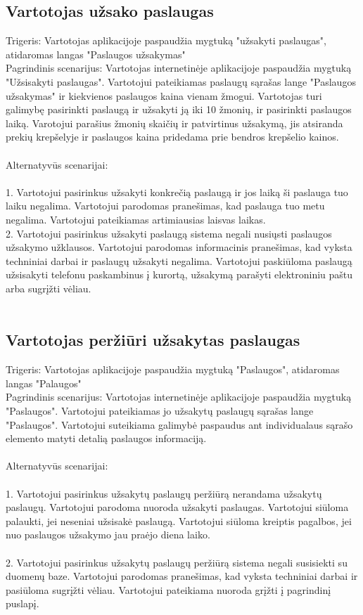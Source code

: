 \documentclass[oneside]{VUMIFPSkursinis}
\begin{document}
\subsection{Vartotojas užsako paslaugas}
	Trigeris: Vartotojas aplikacijoje paspaudžia mygtuką "užsakyti paslaugas", atidaromas langas "Paslaugos užsakymas"\\
	Pagrindinis scenarijus: Vartotojas internetinėje aplikacijoje paspaudžia mygtuką "Užsisakyti paslaugas". Vartotojui pateikiamas paslaugų sąrašas lange "Paslaugos užsakymas" ir kiekvienos paslaugos kaina vienam žmogui. Vartotojas turi galimybę pasirinkti paslaugą ir užsakyti ją iki 10 žmonių, ir pasirinkti paslaugos laiką. Varotojui parašius žmonių skaičių ir patvirtinus užsakymą, jis atsiranda prekių krepšelyje ir paslaugos kaina pridedama prie bendros krepšelio kainos.\\ \\
	Alternatyvūs scenarijai:  \\ \\
1. Vartotojui pasirinkus užsakyti konkrečią paslaugą ir jos laiką ši paslauga tuo laiku negalima. Vartotojui parodomas pranešimas, kad paslauga tuo metu negalima. Vartotojui pateikiamas artimiausias laisvas laikas. \\ 
2. Vartotojui pasirinkus užsakyti paslaugą sistema negali nusiųsti paslaugos užsakymo užklausos. Vartotojui parodomas informacinis pranešimas, kad vyksta techniniai darbai ir paslaugų užsakyti negalima. Vartotojui paskiūloma paslaugą užsisakyti telefonu paskambinus į kurortą, užsakymą parašyti elektroniniu paštu arba sugrįžti vėliau.\\ \\

\subsection{Vartotojas peržiūri užsakytas paslaugas}
	Trigeris: Vartotojas aplikacijoje paspaudžia mygtuką "Paslaugos", atidaromas langas "Palaugos"\\
	Pagrindinis scenarijus: Vartotojas internetinėje aplikacijoje paspaudžia mygtuką "Paslaugos". Vartotojui pateikiamas jo užsakytų paslaugų sąrašas lange "Paslaugos". Vartotojui suteikiama galimybė paspaudus ant individualaus sąrašo elemento matyti detalią paslaugos informaciją.\\ \\
	Alternatyvūs scenarijai:\\ \\
1. Vartotojui pasirinkus užsakytų paslaugų peržiūrą nerandama užsakytų paslaugų. Vartotojui parodoma nuoroda užsakyti paslaugas. Vartotojui siūloma palaukti, jei neseniai užsisakė paslaugą. Vartotojui siūloma kreiptis pagalbos, jei nuo paslaugos užsakymo jau praėjo diena laiko.\\ \\
2. Vartotojui pasirinkus užsakytų paslaugų peržiūrą sistema negali susisiekti su duomenų baze. Vartotojui parodomas pranešimas, kad vyksta techniniai darbai ir pasiūloma sugrįžti vėliau. Vartotojui pateikiama nuoroda grįžti į pagrindinį puslapį.\\ \\
\end{document}
